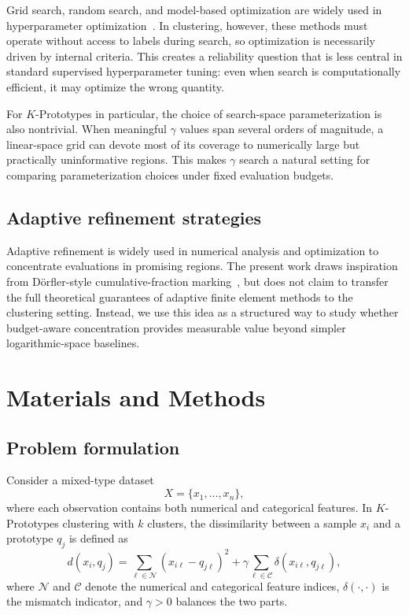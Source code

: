 \documentclass[10pt,lineno]{wlpeerj}
\begin{document}
Grid search, random search, and model-based optimization are widely used in hyperparameter optimization~\citep{bergstra2012,snoek2012,akiba2019optuna,bischl2023hpo}. In clustering, however, these methods must operate without access to labels during search, so optimization is necessarily driven by internal criteria. This creates a reliability question that is less central in standard supervised hyperparameter tuning: even when search is computationally efficient, it may optimize the wrong quantity.

For $K$-Prototypes in particular, the choice of search-space parameterization is also nontrivial. When meaningful $\gamma$ values span several orders of magnitude, a linear-space grid can devote most of its coverage to numerically large but practically uninformative regions. This makes $\gamma$ search a natural setting for comparing parameterization choices under fixed evaluation budgets.

\subsection*{Adaptive refinement strategies}

Adaptive refinement is widely used in numerical analysis and optimization to concentrate evaluations in promising regions. The present work draws inspiration from D\"orfler-style cumulative-fraction marking~\citep{dorfler1996,pfeiler2020dorfler}, but does not claim to transfer the full theoretical guarantees of adaptive finite element methods to the clustering setting. Instead, we use this idea as a structured way to study whether budget-aware concentration provides measurable value beyond simpler logarithmic-space baselines.

\section*{Materials and Methods}

\subsection*{Problem formulation}

Consider a mixed-type dataset
\[
X = \{x_1,\dots,x_n\},
\]
where each observation contains both numerical and categorical features. In $K$-Prototypes clustering with $k$ clusters, the dissimilarity between a sample $x_i$ and a prototype $q_j$ is defined as
\[
d(x_i,q_j) = \sum_{\ell \in \mathcal{N}} (x_{i\ell} - q_{j\ell})^2 + \gamma \sum_{\ell \in \mathcal{C}} \delta(x_{i\ell}, q_{j\ell}),
\]
where $\mathcal{N}$ and $\mathcal{C}$ denote the numerical and categorical feature indices, $\delta(\cdot,\cdot)$ is the mismatch indicator, and $\gamma > 0$ balances the two parts.
\end{document}
